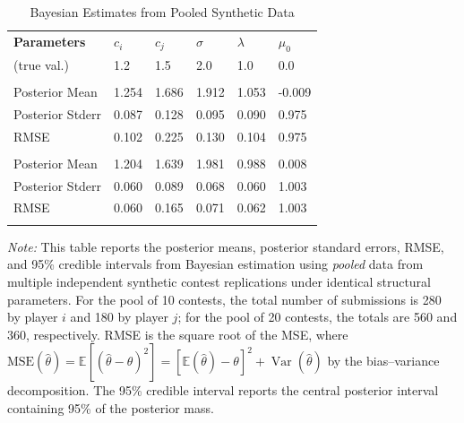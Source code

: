 \documentclass[mnsc]{informs3}
\begin{document}
\begin{table}[htbp]
\centering
\caption{Bayesian Estimates from Pooled Synthetic Data}\label{tbl-pool-synthetic-data}
\begin{tabularx}{\textwidth}{lYYYYY}
\toprule
\textbf{Parameters} & \textbf{$c_i$} & \textbf{$c_j$} & \textbf{$\sigma$} & \textbf{$\lambda$} & \textbf{$\mu_0$}\\
\addlinespace[0.25ex]
\addlinespace[0.25ex]
(true val.)        & 1.2 & 1.5 & 2.0 & 1.0 & 0.0\\
\midrule
\addlinespace
{} \\
Posterior Mean  & 1.254 & 1.686 & 1.912 & 1.053 & -0.009\\
Posterior Stderr & 0.087 & 0.128 & 0.095 & 0.090 & 0.975\\
RMSE                & 0.102 & 0.225 & 0.130 & 0.104 & 0.975\\
\addlinespace
{} \\
Posterior Mean  & 1.204 & 1.639 & 1.981 & 0.988 & 0.008\\
Posterior Stderr & 0.060 & 0.089 & 0.068 & 0.060 & 1.003\\
RMSE                & 0.060 & 0.165 & 0.071 & 0.062 & 1.003\\
\bottomrule
\addlinespace[0.5ex]
\end{tabularx}
\begin{minipage}{\textwidth}
{\footnotesize
\textit{Note:}
This table reports the posterior means, posterior standard errors, RMSE, and 95\% credible intervals from Bayesian estimation using \textit{pooled} data from multiple independent synthetic contest replications under identical structural parameters. For the pool of 10 contests, the total number of submissions is 280 by player $i$ and 180 by player $j$; for the pool of 20 contests, the totals are 560 and 360, respectively.
RMSE is the square root of the MSE, where $\text{MSE}(\hat\theta) = \mathbb{E}[(\hat{\theta}-\theta)^2] = [\mathbb{E}(\hat{\theta}) - \theta]^2 + \operatorname{Var}(\hat{\theta})$ by the bias–variance decomposition.
The 95\% credible interval reports the central posterior interval containing 95\% of the posterior mass.
}
\end{minipage}
\end{table}

\end{document}
